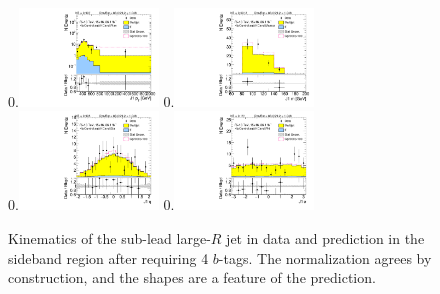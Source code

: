 \begin{figure}[htbp!]
\begin{center}
0.\includegraphics[width=0.33\textwidth, angle=270]{./figures/boosted/Control/Moriond_FourTag_Control_sublHCand_Pt_m_1.pdf}
0.\includegraphics[width=0.33\textwidth, angle=270]{./figures/boosted/Control/Moriond_FourTag_Control_sublHCand_Mass_s.pdf}\\
0.\includegraphics[width=0.33\textwidth, angle=270]{./figures/boosted/Control/Moriond_FourTag_Control_sublHCand_Eta.pdf}
0.\includegraphics[width=0.33\textwidth, angle=270]{./figures/boosted/Control/Moriond_FourTag_Control_sublHCand_Phi.pdf}
  \caption{Kinematics of the sub-lead large-$R$ jet in data and prediction in the sideband region after requiring 4 $b$-tags. The normalization agrees by construction, and the shapes are a feature of the prediction.}
  \label{fig:boosted-4b-control-ak10-subl}
\end{center}
\end{figure}

